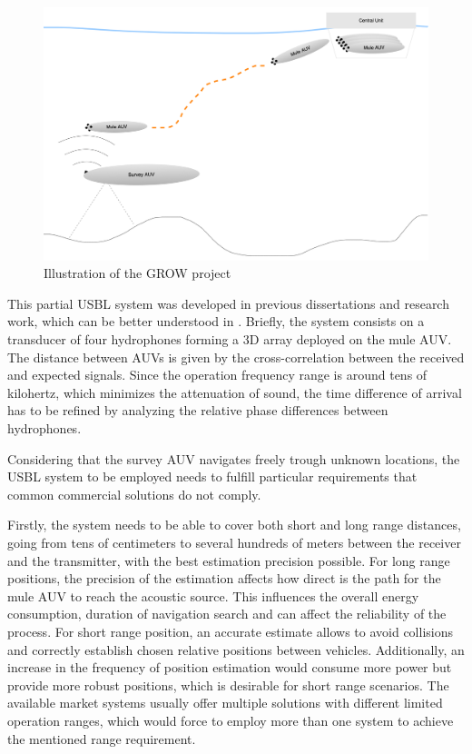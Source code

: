 \begin{figure}[!htbp]
	\centering
	\includegraphics[width=1\textwidth]{figures/GROW}
	\caption{Illustration of the GROW project}
	\label{fig:grow}
\end{figure}


This partial USBL system was developed in previous dissertations and research work, which can be better understood in \cite{afonso-thesis}. Briefly, the system consists on a transducer of four hydrophones forming a 3D array deployed on the mule AUV. The distance between AUVs is given by the cross-correlation between the received and expected signals. Since the operation frequency range is around tens of kilohertz, which minimizes the attenuation of sound, the time difference of arrival has to be refined by analyzing the relative phase differences between hydrophones.

Considering that the survey AUV navigates freely trough unknown locations, the USBL system to be employed needs to fulfill particular requirements that common commercial solutions do not comply. 

Firstly, the system needs to be able to cover both short and long range distances, going from tens of centimeters to several hundreds of meters between the receiver and the transmitter, with the best estimation precision possible. For long range positions, the precision of the estimation affects how direct is the path for the mule AUV to reach the acoustic source. This influences the overall energy consumption, duration of navigation search and can affect the reliability of the process. For short range position, an accurate estimate allows to avoid collisions and correctly establish chosen relative positions between vehicles. Additionally, an increase in the frequency of position estimation would consume more power but provide more robust positions, which is desirable for short range scenarios. The available market systems usually offer multiple solutions with different limited operation ranges, which would force to employ more than one system to achieve the mentioned range requirement.

